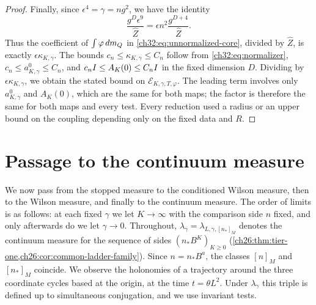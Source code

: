 \begin{proof}
Finally, since $\epsilon^4=\gamma=ng^2$, we have the identity
\[
 \frac{g^D\epsilon^9}{\widehat Z}=\epsilon n^2\frac{g^{D+4}}{\widehat Z}.
\]
Thus the coefficient of $\int\varphi\,dm_Q$ in \eqref{ch32:eq:unnormalized-core}, divided by $\widehat Z$, is exactly $\epsilon\kappa_{K,\gamma}$. The bounds $c_n\le\kappa_{K,\gamma}\le C_n$ follow from \eqref{ch32:eq:normalizer}, $c_n\le a^0_{K,\gamma}\le C_n$, and $c_nI\le A_K(0)\le C_nI$ in the fixed dimension $D$. Dividing by $\epsilon\kappa_{K,\gamma}$, we obtain the stated bound on $\mathcal E_{K,\gamma,T,\varphi}$. The leading term involves only $a^0_{K,\gamma}$ and $A_K(0)$, which are the same for both maps; the factor is therefore the same for both maps and every test. Every reduction used a radius or an upper bound on the coupling depending only on the fixed data and $R$.
\end{proof}

\section{Passage to the continuum measure}\label{ch32:sec:continuum}

We now pass from the stopped measure to the conditioned Wilson measure, then to the Wilson measure, and finally to the continuum measure. The order of limits is as follows: at each fixed $\gamma$ we let $K\to\infty$ with the comparison side $n$ fixed, and only afterwards do we let $\gamma\to0$. Throughout, $\lambda_\gamma=\lambda_{L,\gamma,[n_*]_M}$ denotes the continuum measure for the sequence of sides $(n_*B^K)_{K\ge0}$ (\cref{ch26:thm:tier-one,ch26:cor:common-ladder-family}). Since $n=n_*B^{a}$, the classes $[n]_M$ and $[n_*]_M$ coincide. We observe the holonomies of a trajectory around the three coordinate cycles based at the origin, at the time $t=\theta L^2$. Under $\lambda_\gamma$ this triple is defined up to simultaneous conjugation, and we use invariant tests.

